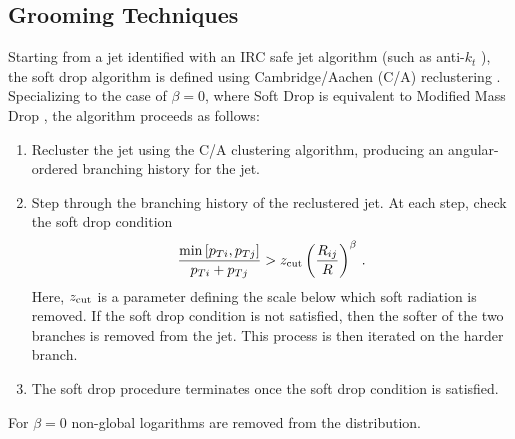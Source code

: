 \subsection{Grooming Techniques}\label{sec:groom_tech}

Starting from a jet identified with an IRC safe jet algorithm (such as anti-$k_t$ \cite{Cacciari:2008gp}), the soft drop algorithm is defined using Cambridge/Aachen (C/A) reclustering \cite{Dokshitzer:1997in,Wobisch:1998wt,Wobisch:2000dk}.  Specializing to the case of $\beta=0$, where Soft Drop is equivalent to Modified Mass Drop \cite{Dasgupta:2013ihk}, the algorithm proceeds as follows:
\begin{enumerate}

\item Recluster the jet using the C/A clustering algorithm, producing an angular-ordered branching history for the jet.

\item Step through the branching history of the reclustered jet.  At each step, check the soft drop condition
\begin{align}\label{eq:sd_cut}
\frac{\min\left[ p_{Ti}, p_{Tj}  \right]}{p_{Ti}+p_{Tj}}> z_{\rm cut} \left(   \frac{R_{ij}}{R}\right)^\beta \,.
\end{align}
Here, $z_{\rm cut}$ is a parameter defining the scale below which soft radiation is removed.  If the soft drop condition is not satisfied, then the softer of the two branches is removed from the jet.  This process is then iterated on the harder branch.

\item The soft drop procedure terminates once the soft drop condition is satisfied.

\end{enumerate}

For $\beta=0$ non-global logarithms are removed from the distribution.  





